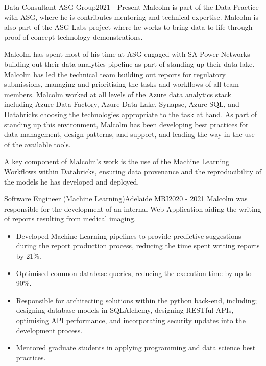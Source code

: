 

\begin{cventry}{Data Consultant} {ASG Group}{}{2021 - Present}
  Malcolm is part of the Data Practice with ASG,
  where he is contributes mentoring and technical expertise.
  Malcolm is also part of the ASG Labs project
  where he works to bring data to life through
  proof of concept technology demonstrations.

  Malcolm has spent most of his time at ASG engaged with SA Power Networks
  building out their data analytics pipeline
  as part of standing up their data lake.
  Malcolm has led the technical team
  building out reports for regulatory submissions,
  managing and prioritising the
  tasks and workflows of all team members.
  Malcolm worked at all levels of the Azure data analytics stack
  including Azure Data Factory, Azure Data Lake, Synapse, Azure SQL, and Databricks
  choosing the technologies appropriate to the task at hand.
  As part of standing up this environment,
  Malcolm has been developing best practices
  for data management, design patterns, and support,
  and leading the way in the use of the available tools.

  A key component of Malcolm's work is the use of
  the Machine Learning Workflows within Databricks,
  ensuring data provenance and the reproducibility of the models
  he has developed and deployed.
\end{cventry}

\begin{cventry}{Software Engineer (Machine Learning)}{Adelaide MRI}{}{2020 - 2021}
  Malcolm was responsible for the development of an internal Web Application
  aiding the writing of reports resulting from medical imaging.
  \begin{itemize}
    \item Developed Machine Learning pipelines to provide predictive
      suggestions during the report production process, reducing the time spent
      writing reports by 21\%.
    \item Optimised common database queries, reducing the execution time by
      up to 90\%.
    \item Responsible for architecting solutions
      within the python back-end, including;
      designing database models in SQLAlchemy,
      designing RESTful APIs,
      optimising API performance,
      and incorporating security updates into the development process.
    \item Mentored graduate students in applying programming and data science
      best practices.
  \end{itemize}
\end{cventry}

